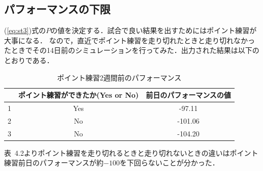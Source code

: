 \documentclass[12pt,fleqn]{jreport}
\begin{document}
\subsection{パフォーマンスの下限}
(\ref{eq:st3})式の$P$の値を決定する．試合で良い結果を出すためにはポイント練習が大事になる．
なので，直近でポイント練習を走り切れたときと走り切れなかったときでその14日前のシミュレーションを行ってみた．出力された結果は以下のとおりである．
\begin{table}[H]
  \caption{ポイント練習2週間前のパフォーマンス}
  \begin{center}
    \begin{tabular}{|c|c|c|}
      \hline
        & ポイント練習ができたか(Yes or No) & 前日のパフォーマンスの値 \\
      \hline
      1 & Yes                               & -97.11                   \\
      \hline
      2 & No                                & -101.06                  \\
      \hline
      3 & No                                & -104.20                  \\
      \hline
    \end{tabular}
  \end{center}
\end{table}
表\ 4.2よりポイント練習を走り切れるときと走り切れないときの違いはポイント練習前日のパフォーマンスが約$-100$を下回らないことが分かった．
\end{document}
